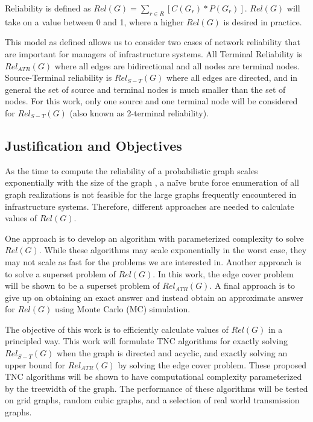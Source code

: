 Reliability is defined as \(Rel(G) = \sum_{r \in R} [C(G_r)*P(G_r)]\). \(Rel(G)\) will take on a value between 0 and 1, where a higher \(Rel(G)\) is desired in practice.

This model as defined allows us to consider two cases of network reliability that are important for managers of infrastructure systems. All Terminal Reliability is \(Rel_{ATR}(G)\) where all edges are bidirectional and all nodes are terminal nodes. Source-Terminal reliability is \(Rel_{S-T}(G)\) where all edges are directed, and in general the set of source and terminal nodes is much smaller than the set of nodes. For this work, only one source and one terminal node will be considered for \(Rel_{S-T}(G)\) (also known as 2-terminal reliability).

\hypertarget{justification-and-objectives}{%
\subsection{Justification and Objectives}\label{justification-and-objectives}}

As the time to compute the reliability of a probabilistic graph scales exponentially with the size of the graph \cite{valiant1979complexity}, a naïve brute force enumeration of all graph realizations is not feasible for the large graphs frequently encountered in infrastructure systems. Therefore, different approaches are needed to calculate values of \(Rel(G)\).

One approach is to develop an algorithm with parameterized complexity to solve \(Rel(G)\). While these algorithms may scale exponentially in the worst case, they may not scale as fast for the problems we are interested in. Another approach is to solve a superset problem of \(Rel(G)\). In this work, the edge cover problem will be shown to be a superset problem of \(Rel_{ATR}(G)\). A final approach is to give up on obtaining an exact answer and instead obtain an approximate answer for \(Rel(G)\) using Monte Carlo (MC) simulation.

The objective of this work is to efficiently calculate values of \(Rel(G)\) in a principled way. This work will formulate TNC algorithms for exactly solving \(Rel_{S-T}(G)\) when the graph is directed and acyclic, and exactly solving an upper bound for \(Rel_{ATR}(G)\) by solving the edge cover problem. These proposed TNC algorithms will be shown to have computational complexity parameterized by the treewidth of the graph. The performance of these algorithms will be tested on grid graphs, random cubic graphs, and a selection of real world transmission graphs.

